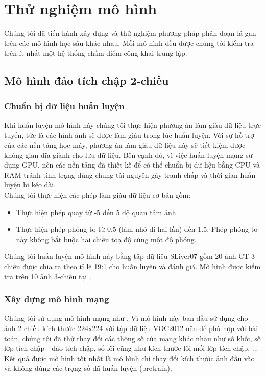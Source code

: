 \chapter{Thử nghiệm mô hình}
Chúng tôi đã tiến hành xây dựng và thử nghiệm phương pháp phân đoạn lá gan trên các mô hình học sâu khác nhau. Mỗi mô hình đều được chúng tôi kiểm tra trên ít nhất một hệ thống chấm điểm công khai trung lập.
\section{Mô hình đảo tích chập 2-chiều}
\subsection{Chuẩn bị dữ liệu huấn luyện}
Khi huấn luyện mô hình này chúng tôi thực hiện phương án làm giàu dữ liệu trực tuyến, tức là các hình ảnh sẽ được làm giàu trong lúc huấn luyện. Với sự hỗ trợ của các nền tảng học máy, phương án làm giàu dữ liệu này sẽ tiết kiệm được không gian đĩa giành cho lưu dữ liệu. Bên cạnh đó, vì việc huấn luyện mạng sử dụng GPU, nên các nền tảng đã thiết kế để có thể chuẩn bị dữ liệu bằng CPU và RAM tránh tình trạng dùng chung tài nguyên gây tranh chấp và thời gian huấn luyện bị kéo dài.\\
Chúng tôi thực hiện các phép làm giàu dữ liệu cơ bản gồm:
\begin{itemize}
    \item Thực hiện phép quay từ -5 đến 5 độ quan tâm ảnh.
    \item Thực hiện phép phóng to từ 0.5 (làm nhỏ đi hai lần) đến 1.5. Phép phóng to này không bắt buộc hai chiều toạ độ cùng một độ phóng.
\end{itemize}
Chúng tôi huấn luyện mô hình này bằng tập dữ liệu SLiver07 gồm 20 ảnh CT 3-chiều được chia ra theo tỉ lệ 19:1 cho huấn luyện và đánh giá. Mô hình được kiểm tra trên 10 ảnh 3-chiều tại \cite{website:slvier07}.
\subsection{Xây dựng mô hình mạng}
Chúng tôi sử dụng mô hình mạng như \cite{unpoolref}. Vì mô hình này ban đầu sử dụng cho ảnh 2 chiều kích thước 224x224 với tập dữ liệu VOC2012 nên để phù hợp với bài toán, chúng tôi đã thử thay đổi các thông số của mạng khác nhau như số khối, số lớp tích chập - đảo tích chập, số lõi cũng như kích thước lõi mối lớp tích chập, ... Kết quả được mô hình tốt nhất là mô hình chỉ thay đổi kích thước ảnh đầu vào và không dùng các trọng số đã huấn luyện (pretrain).
